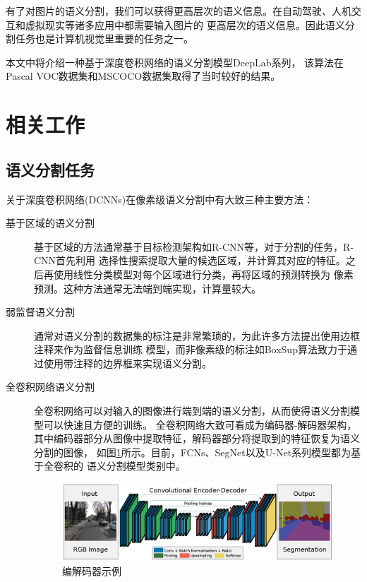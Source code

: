 \documentclass[10pt, a4paper]{article}
\begin{document}
有了对图片的语义分割，我们可以获得更高层次的语义信息。在自动驾驶、人机交互和虚拟现实等诸多应用中都需要输入图片的
更高层次的语义信息。因此语义分割任务也是计算机视觉里重要的任务之一。

本文中将介绍一种基于深度卷积网络的语义分割模型DeepLab\cite{Deeplab1,Deeplab2,Deeplab3}系列，
该算法在Pascal VOC数据集\cite{VOC}和MSCOCO数据集\cite{COCO}取得了当时较好的结果。

\section{相关工作}
\subsection{语义分割任务}
关于深度卷积网络(DCNNs)在像素级语义分割中有大致三种主要方法：

\begin{description}
    \item[基于区域的语义分割] 基于区域的方法通常基于目标检测架构如R-CNN\cite{RCNN}等，对于分割的任务，R-CNN首先利用
    选择性搜索提取大量的候选区域，并计算其对应的特征。之后再使用线性分类模型对每个区域进行分类，再将区域的预测转换为
    像素预测。这种方法通常无法端到端实现，计算量较大。
    \item[弱监督语义分割] 通常对语义分割的数据集的标注是非常繁琐的，为此许多方法提出使用边框注释来作为监督信息训练
    模型，而非像素级的标注如BoxSup\cite{BoxSup}算法致力于通过使用带注释的边界框来实现语义分割。
    \item[全卷积网络语义分割] 全卷积网络可以对输入的图像进行端到端的语义分割，从而使得语义分割模型可以快速且方便的训练。
    全卷积网络大致可看成为编码器-解码器架构，其中编码器部分从图像中提取特征，解码器部分将提取到的特征恢复为语义分割的图像，
    如图\ref{p1}所示。目前，FCNs\cite{FCN}、SegNet\cite{SegNet}以及U-Net\cite{UNet}系列模型都为基于全卷积的
    语义分割模型类别中。

    \begin{figure}[htbp]
        \centering
        \includegraphics[width=\textwidth]{imgs/p1.eps}
        \caption{编解码器示例\cite{SegNet}}
        \label{p1}
    \end{figure}
\end{description}
\end{document}

